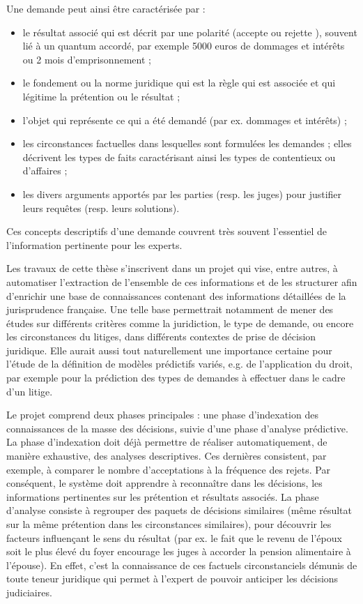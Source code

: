 Une demande peut ainsi être caractérisée par :
 \begin{itemize}
	\item le résultat associé qui est décrit par une polarité (\og accepte \fg{} ou \og rejette \fg{}), souvent lié à un quantum accordé, par exemple 5000 euros de dommages et intérêts ou 2 mois d'emprisonnement ;
	\item le fondement ou la norme juridique qui est la règle qui est associée et qui légitime la prétention ou le résultat ;	
	\item l'objet qui représente ce qui a été demandé (par ex. dommages et intérêts) ;
	\item les circonstances factuelles dans lesquelles sont formulées les demandes ; elles décrivent les types de faits caractérisant ainsi les types de contentieux ou d'affaires ;
	\item les divers arguments apportés par les parties (resp. les juges) pour justifier leurs requêtes (resp. leurs solutions).
 \end{itemize}

Ces concepts descriptifs d'une demande couvrent très souvent l'essentiel de l'information pertinente pour les experts. 

Les travaux de cette thèse s'inscrivent dans un projet qui vise, entre autres, à automatiser l'extraction de l'ensemble de ces informations et de les structurer afin d'enrichir une base de connaissances contenant des informations détaillées de la jurisprudence française. Une telle base permettrait notamment de mener des études sur différents critères comme la juridiction, le type de demande, ou encore les circonstances du litiges, dans différents contextes de prise de décision juridique. Elle aurait aussi tout naturellement une importance certaine pour l'étude  de la définition de modèles prédictifs variés, e.g. de l'application du droit, par exemple pour la prédiction des types de demandes à effectuer dans le cadre d'un litige. 

Le projet comprend deux phases principales : une phase d'indexation des connaissances de la masse des décisions, suivie d'une phase d'analyse prédictive. La phase d'indexation doit déjà permettre de réaliser automatiquement, de manière exhaustive, des analyses descriptives. Ces dernières consistent, par exemple, à comparer le nombre d'acceptations à la fréquence des rejets. Par conséquent, le système doit apprendre à reconnaître dans les décisions, les informations pertinentes sur les prétention et résultats associés. La phase d'analyse consiste à regrouper des paquets de décisions similaires (même résultat sur la même prétention dans les circonstances similaires), pour découvrir les facteurs influençant le sens du résultat (par ex. le fait que \og le revenu de l'époux soit le plus élevé du foyer\fg{} encourage les juges à accorder la pension alimentaire à l'épouse). En effet, c'est la connaissance de ces factuels circonstanciels démunis de toute teneur juridique qui permet à l'expert de pouvoir anticiper les décisions judiciaires.

